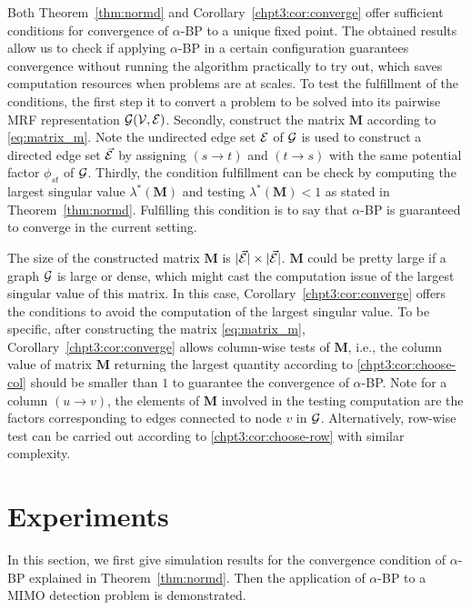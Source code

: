 \begin{remark}
  
  Both Theorem~\ref{thm:normd} and Corollary~\ref{chpt3:cor:converge} offer sufficient conditions for convergence of $\alpha$-BP to a unique fixed point. The obtained results allow us to check if applying $\alpha$-BP in a certain configuration guarantees convergence without running the algorithm practically to try out, which saves computation resources when problems are at scales. To test the fulfillment of the conditions, the first step it to convert a problem to be solved into its pairwise MRF representation $\mathcal{G}(\mathcal{V}, \mathcal{E})$. Secondly, construct the matrix $\bm{M}$ according to \eqref{eq:matrix_m}. Note the undirected edge set $\mathcal{E}$ of $\mathcal{G}$ is used to construct a directed edge set $\vec{\mathcal{E}}$ by assigning $(s\rightarrow t)$ and $(t\rightarrow s)$ with the same potential factor $\phi_{st}$ of $\mathcal{G}$. Thirdly, the condition fulfillment can be check by computing the largest singular value $\lambda^{\ast}(\bm{M})$ and testing $\lambda^{\ast}(\bm{M}) < 1$ as stated in Theorem~\ref{thm:normd}. Fulfilling this condition is to say that $\alpha$-BP is guaranteed to converge in the current setting.

  The size of the constructed matrix $\bm{M}$ is $| \vec{\mathcal{E}} | \times | \vec{\mathcal{E}} |$. $\bm{M}$ could be pretty large if a graph $\mathcal{G}$ is large or dense, which might cast the computation issue of the largest singular value of this matrix. In this case, Corollary~\ref{chpt3:cor:converge} offers the conditions to avoid the computation of the largest singular value. To be specific, after constructing the matrix \eqref{eq:matrix_m}, Corollary~\ref{chpt3:cor:converge} allows column-wise tests of $\bm{M}$, i.e., the column value of matrix $\bm{M}$ returning the largest quantity according to \eqref{chpt3:cor:choose-col} should be smaller than $1$ to guarantee the convergence of $\alpha$-BP. Note for a column $(u\rightarrow v)$, the elements of $\bm{M}$ involved in the testing computation are the factors corresponding to edges connected to node $v$ in $\mathcal{G}$. Alternatively, row-wise test can be carried out according to \eqref{chpt3:cor:choose-row} with similar complexity.
\end{remark}


\section{Experiments}

In this section, we first give simulation results for the convergence condition of $\alpha$-BP explained in Theorem~\ref{thm:normd}. Then the application of $\alpha$-BP to a MIMO detection problem is demonstrated.

